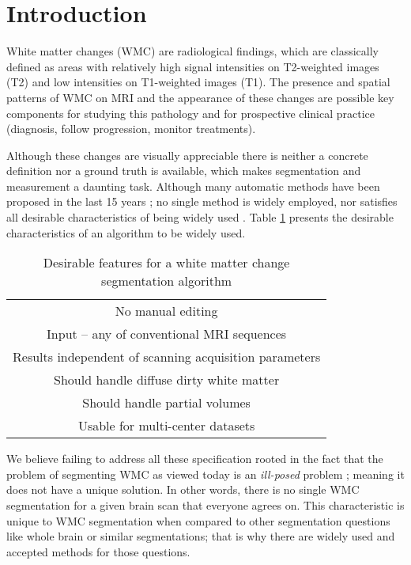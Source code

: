 \section{Introduction} \label{intro}


White matter changes (WMC) are radiological findings, which are classically defined as areas with relatively high signal intensities on T2-weighted images (T2) and low intensities on T1-weighted images (T1). The presence and spatial patterns of WMC on MRI and the appearance of these changes are possible key components for studying this pathology and for prospective clinical practice (diagnosis, follow progression, monitor treatments).

Although these changes are visually appreciable there is neither a concrete definition nor a ground truth is available, which makes segmentation and measurement a daunting task. Although many automatic methods have been proposed in the last 15 years \cite{Kamber_1995,Udupa_1997,Boudraa2000,Zijdenbos_2002,LesionTOADS_2010,OutlierLocalIntensity_2011,CascadeOrig,LesionSegmentationToolbox_2012,kNN-TTPs_2013,Rotation-invariant_2015}; no single method is widely employed, nor satisfies all desirable characteristics of being widely used \cite{GarciaReview}. Table \ref{Table:Requirements} presents the desirable characteristics of an algorithm to be widely used.

\begin{table}
\centering
    \begin{tabular}  {  c }
    \hline
        No manual editing \\ 
        Input – any of conventional MRI sequences \\ 
        Results independent of scanning acquisition parameters \\ 
        Should handle diffuse dirty white matter \\ 
        Should handle partial volumes \\ 
        Usable for multi-center datasets \\
    \hline
    \end{tabular} 
    \caption{Desirable features for a white matter change segmentation algorithm } 
    \label{Table:Requirements}
\end{table}
    
We believe failing to address all these specification rooted in the fact that the problem of segmenting WMC as viewed today is an \textit{ill-posed} problem \cite{IllPosed}; meaning it does not have a unique solution. In other words, there is no single WMC segmentation for a given brain scan that everyone agrees on. This characteristic is unique to WMC segmentation when compared to other segmentation questions like whole brain or similar segmentations; that is why there are widely used and accepted methods for those questions.

